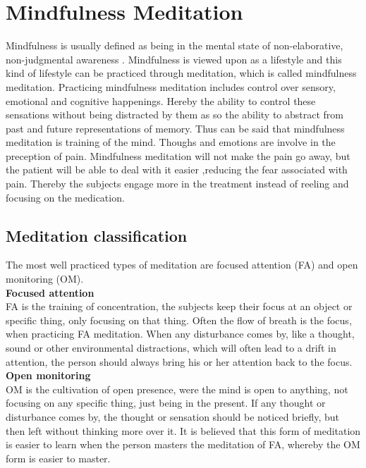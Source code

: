 \section{Mindfulness Meditation}
Mindfulness is usually defined as being in the mental state of non-elaborative, non-judgmental awareness \cite{Zeidan2012,Zeidan2016,Tang2017}. Mindfulness is viewed upon as a lifestyle and this kind of lifestyle can be practiced through meditation, which is called mindfulness meditation. Practicing mindfulness meditation includes control over sensory, emotional and cognitive happenings. Hereby the ability to control these sensations without being distracted by them as so the ability to abstract from past and future representations of memory. Thus can be said that mindfulness meditation is training of the mind. \cite{Tang2017}
Thoughs and emotions are involve in the preception of pain.
Mindfulness meditation will not make the pain go away, but the patient will be able to deal with it easier ,reducing the fear associated with pain. Thereby the subjects engage more in the treatment instead of reeling and focusing on the medication. \cite{Jacob2016}

\subsection{Meditation classification}
The most well practiced types of meditation are focused attention (FA) and open monitoring (OM).\cite{Zeidan2016}\\
\textbf{Focused attention}\\ 
FA is the training of concentration, the subjects keep their focus at an object or specific thing, only focusing on that thing. Often the flow of breath is the focus, when practicing FA meditation.  When any disturbance comes by, like a thought, sound or other environmental distractions, which will often lead to a drift in attention, the person should always bring his or her attention back to the focus. \cite{Zeidan2016}\\
\textbf{Open monitoring}\\
OM is the cultivation of open presence, were the mind is open to anything, not focusing on any specific thing, just being in the present. If any thought or disturbance comes by, the thought or sensation should be noticed briefly, but then left without thinking more over it. It is believed that this form of meditation is easier to learn when the person masters the meditation of FA, whereby the OM form is easier to master. \cite{Zeidan2016}


